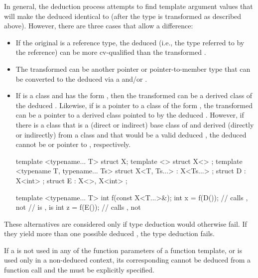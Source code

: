 \pnum
In general, the deduction process attempts to find template argument
values that will make the deduced
identical to
(after
the type
is transformed as described above).
However, there are
three cases that allow a difference:
\begin{itemize}
\item
If the original
is a reference type, the deduced
(i.e.,
the type referred to by the reference) can be more cv-qualified than
the transformed .
\item
The transformed 
can be another pointer or pointer-to-member type that can be converted
to the deduced
via a  and/or
.

\item
If
is a class and
has the form
,
then
the transformed 
can be a derived class  of the
deduced
.
Likewise, if
is a pointer to a class of the form
,
the transformed 
can be a pointer to a
derived class  pointed to by the deduced
.
However, if there is a class  that is
a (direct or indirect) base class of  and
derived (directly or indirectly) from a class  and
that would be a valid deduced ,
the deduced  cannot be  or pointer to ,
respectively.
\begin{example}
\begin{codeblock}
template <typename... T> struct X;
template <> struct X<> {};
template <typename T, typename... Ts>
  struct X<T, Ts...> : X<Ts...> {};
struct D : X<int> {};
struct E : X<>, X<int> {};

template <typename... T>
int f(const X<T...>&);
int x = f(D());     // calls , not 
                    //  is ,  is 
int z = f(E());     // calls , not 
\end{codeblock}
\end{example}
\end{itemize}

\pnum
These alternatives are considered only if type deduction would
otherwise fail.
If they yield more than one possible deduced
,
the type deduction fails.
\begin{note}
If a
is not used in any of the function parameters of a function template,
or is used only in a non-deduced context, its corresponding
cannot be deduced from a function call and the
must be explicitly specified.
\end{note}


